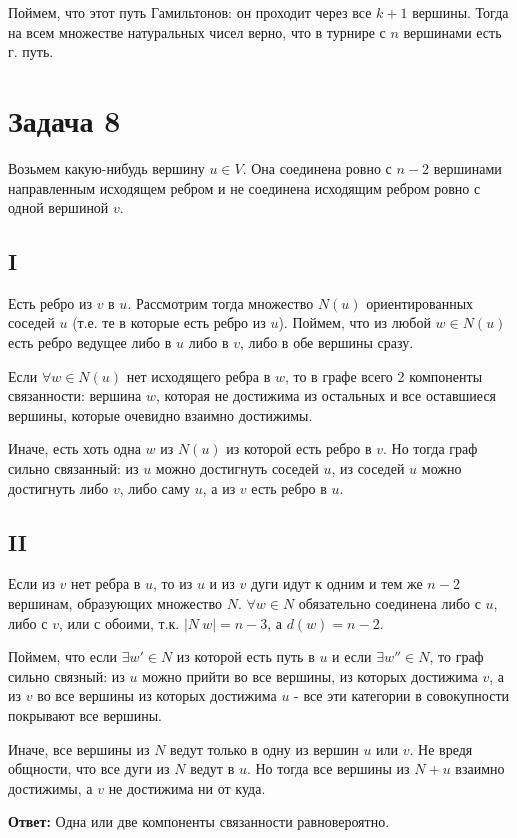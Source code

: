 \documentclass{article}
\begin{document}
	Поймем, что этот путь Гамильтонов: он проходит через все $k + 1$ вершины. Тогда на всем множестве натуральных чисел верно, что в турнире с $n$ вершинами есть г. путь.
	
	\section{Задача 8}
	
	Возьмем какую-нибудь вершину $u \in V$. Она соединена ровно с $n - 2$ вершинами направленным исходящем ребром и не соединена исходящим ребром ровно с одной вершиной $v$.
	
	\subsection{I}
	Есть ребро из $v$ в $u$. Рассмотрим тогда множество $N(u)$ ориентированных соседей $u$ (т.е. те в которые есть ребро из $u$). Поймем, что из любой $w \in N(u)$ есть ребро ведущее либо в $u$ либо в $v$, либо в обе вершины сразу.
	
	Если $\forall w \in N(u)$ нет исходящего ребра в $w$, то в графе всего 2 компоненты связанности: вершина $w$, которая не достижима из остальных и все оставшиеся вершины, которые очевидно взаимно достижимы. 
	
	Иначе, есть хоть одна $w$ из $N(u)$ из которой есть ребро в $v$. Но тогда граф сильно связанный: из $u$ можно достигнуть соседей $u$, из соседей $u$ можно достигнуть либо $v$, либо саму $u$, а из $v$ есть ребро в $u$.
	
	
	\subsection{II}
	
	Если из $v$ нет ребра в $u$, то из $u$ и из $v$ дуги идут к одним и тем же $n - 2$ вершинам, образующих множество $N$. $\forall w \in N$ обязательно соединена либо с $u$, либо с $v$, или с обоими, т.к. $|N \ {w}| = n - 3$, а $d(w) = n - 2$.
	
	Поймем, что если $\exists w' \in N $ из которой есть путь в $u$ и если $\exists w'' \in N $, то граф сильно связный: из $u$ можно прийти во все вершины, из которых достижима $v$, а из $v$ во все вершины из которых достижима $u$ - все эти категории в совокупности покрывают все вершины. 
	
	
	Иначе, все вершины из $N$ ведут только в одну из вершин $u$ или $v$. Не вредя общности, что все дуги из $N$ ведут в $u$. Но тогда все вершины из $N + {u}$ взаимно достижимы, а $v$ не достижима ни от куда.
	
	\textbf{Ответ:} Одна или две компоненты связанности равновероятно. 
	 
	
\end{document}
